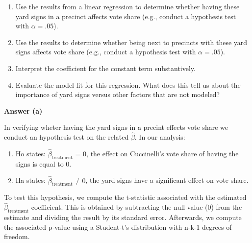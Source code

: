 \documentclass[12pt,letterpaper]{article}
\begin{document}
\vspace{.5cm}
\begin{enumerate}
	\item [(a)] Use the results from a linear regression to determine whether having these yard signs in a precinct affects vote share (e.g., conduct a hypothesis test with $\alpha = .05$).
	
	\vspace{1.5cm}
	\item [(b)]  Use the results to determine whether being
	next to precincts with these yard signs affects vote
	share (e.g., conduct a hypothesis test with $\alpha = .05$).
	
	\vspace{1.5cm}
	\item [(c)] Interpret the coefficient for the constant term substantively.
	\vspace{1.5cm}
	
	\item [(d)] Evaluate the model fit for this regression.  What does this	tell us about the importance of yard signs versus other factors that are not modeled?
	
\end{enumerate}  

\vspace{2cm}
\noindent\textbf{Answer (a)}\\
\vspace{0.5cm}

\noindent In verifying wheter having the yard signs in a precint effects vote share we conduct an hypothesis test on the related $\hat{\beta}$. In our analysis:
\begin{enumerate}
	\item Ho states: $\hat{\beta}_{\text{treatment}}$ = 0, the effect on Cuccinelli's vote share of having the signs is equal to 0.\\
	\item Ha states: $\hat{\beta}_{\text{treatment}} \ne 0$, the yard signs have a significant effect on vote share.\\ 
\end{enumerate}
\noindent To test this hypothesis, we compute the t-statistic associated with the estimated $\hat{\beta}_{\text{treatment}}$ coefficient. This is obtained by subtracting the null value (0) from the estimate and dividing the result by its standard error. Afterwards, we compute the associated p-value using a Student-t's distribution with n-k-1 degrees of freedom. 
\end{document}

